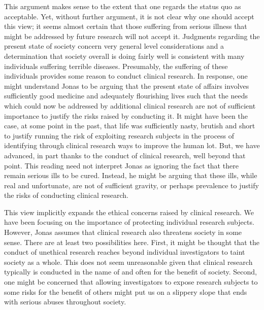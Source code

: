 \documentclass[12p]{article}
\begin{document}
This argument makes sense to the extent that one regards the status quo as acceptable. Yet, without further argument, it is not clear why one should accept this view; it seems almost certain that those suffering from serious illness that might be addressed by future research will not accept it. Judgments regarding the present state of society concern very general level considerations and a determination that society overall is doing fairly well is consistent with many individuals suffering terrible diseases. Presumably, the suffering of these individuals provides some reason to conduct clinical research. In response, one might understand Jonas to be arguing that the present state of affairs involves sufficiently good medicine and adequately flourishing lives such that the needs which could now be addressed by additional clinical research are not of sufficient importance to justify the risks raised by conducting it. It might have been the case, at some point in the past, that life was sufficiently nasty, brutish and short to justify running the risk of exploiting research subjects in the process of identifying through clinical research ways to improve the human lot. But, we have advanced, in part thanks to the conduct of clinical research, well beyond that point. This reading need not interpret Jonas as ignoring the fact that there remain serious ills to be cured. Instead, he might be arguing that these ills, while real and unfortunate, are not of sufficient gravity, or perhaps prevalence to justify the risks of conducting clinical research.

This view implicitly expands the ethical concerns raised by clinical research. We have been focusing on the importance of protecting individual research subjects. However, Jonas assumes that clinical research also threatens society in some sense. There are at least two possibilities here. First, it might be thought that the conduct of unethical research reaches beyond individual investigators to taint society as a whole. This does not seem unreasonable given that clinical research typically is conducted in the name of and often for the benefit of society. Second, one might be concerned that allowing investigators to expose research subjects to some risks for the benefit of others might put us on a slippery slope that ends with serious abuses throughout society.
\end{document}
